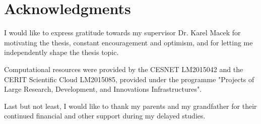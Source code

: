 
\bigskip

\begingroup
\let\clearpage\relax
\let\cleardoublepage\relax
\let\cleardoublepage\relax
\chapter*{Acknowledgments}

I would like to express gratitude towards my supervisor Dr. Karel Macek for motivating the thesis, constant encouragement and optimism, and for letting me independently shape the thesis topic.

Computational resources were provided by the CESNET LM2015042 and the CERIT Scientific Cloud LM2015085, provided under the programme "Projects of Large Research, Development, and Innovations Infrastructures".

Last but not least, I would like to thank my parents and my grandfather for their continued financial and other support during my delayed studies.


\endgroup



